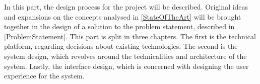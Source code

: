 In this part, the design process for the project will be described. 
Original ideas and expansions on the concepts analysed in \cref{StateOfTheArt} will be brought together in the design of a solution to the problem statement, described in \cref{ProblemStatement}.
This part is split in three chapters.
The first is the technical platform, regarding decisions about existing technologies.
The second is the system design, which revolves around the technicalities and architecture of the system.
Lastly, the interface design, which is concerned with designing the user experience for the system.